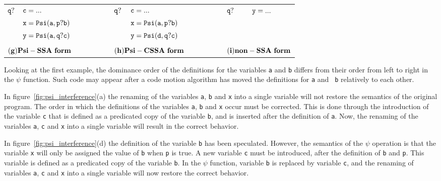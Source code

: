 \begin{figure*}
\begin{center}
\begin{tabular}{llllllll}
${\tt q?}$  & ${\tt c = ...}$ & \ \ \ \ \ \ \ \  & ${\tt q?}$ & ${\tt c = ...}$ & \ \ \ \ \ \ \ \  & ${\tt q?}$ & ${\tt y = ...}$ \\
            & ${\tt x = Psi(a,p?b)}$ & \ \ \ \ \ \ \ \  &     & ${\tt x = Psi(a,p?b)}$  & \ \ \ \ \ \ \ \ &     & \\
            & ${\tt y = Psi(a,q?c)}$ & \ \ \ \ \ \ \ \  &     & ${\tt y = Psi(d,q?c)}$  & \ \ \ \ \ \ \ \ &     & \\
\\
\multicolumn{2}{l}{${\tt {\bf (g) Psi-SSA\ form}}$} & \ \ \ \ \ \ \ \  &\multicolumn{2}{l}{${\tt {\bf (h) Psi-CSSA\ form}}$} & \ \ \ \ \ \ \ \  &\multicolumn{2}{l}{${\tt {\bf (i) non-SSA\ form}}$} \\
\end{tabular}
\caption{$\psi$-SSA, $\psi$-CSSA forms and non-SSA form after destruction}
\label{fig:psi_interference}
\end{center}
\end{figure*}


Looking at the first example, the dominance order of the definitions
for the variables {\tt a} and {\tt b} differs from their order from
left to right in the $\psi$ function. Such code may appear after a
code motion algorithm has moved the definitions for {\tt a} and {\tt
b} relatively to each other.


In figure~\ref{fig:psi_interference}(a) the renaming of the variables
{\tt a}, {\tt b} and {\tt x} into a single variable will not restore
the semantics of the original program. The order in which the
definitions of the variables {\tt a}, {\tt b} and {\tt x} occur must
be corrected. This is done through the introduction of the variable
{\tt c} that is defined as a predicated copy of the variable {\tt b},
and is inserted after the definition of {\tt a}. Now, the renaming of
the variables {\tt a}, {\tt c} and {\tt x} into a single variable will
result in the correct behavior.

In figure~\ref{fig:psi_interference}(d) the definition of the variable
{\tt b} has been speculated. However, the semantics of the $\psi$
operation is that the variable {\tt x} will only be assigned the value
of {\tt b} when {\tt p} is true. A new variable {\tt c} must be
introduced, after the definition of {\tt b} and {\tt p}. This variable
is defined as a predicated copy of the variable {\tt b}. In the
${\psi}$ function, variable {\tt b} is replaced by variable {\tt c},
and the renaming of variables {\tt a}, {\tt c} and {\tt x} into a
single variable will now restore the correct behavior.

